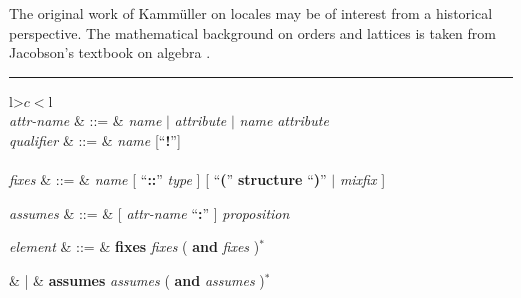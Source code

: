 \begin{isabellebody}
\begin{isamarkuptext}
  The original work of Kamm\"uller on locales \cite{KammullerEtAl1999}
  may be of interest from a historical perspective.  The mathematical
  background on orders and lattices is taken from Jacobson's textbook
  on algebra \cite[Chapter~8]{Jacobson1985}.%
\end{isamarkuptext}%
\isamarkuptrue%
%
\begin{isamarkuptext}%
\begin{table}
\hrule
\vspace{2ex}
\begin{center}
\begin{tabular}{l>$c<$l}
   \\

  \textit{attr-name} & ::=
  & \textit{name} $|$ \textit{attribute} $|$
    \textit{name} \textit{attribute} \\
  \textit{qualifier} & ::=
  & \textit{name} [``\textbf{!}''] \\[2ex]

   \\

  \textit{fixes} & ::=
  & \textit{name} [ ``\textbf{::}'' \textit{type} ]
    [ ``\textbf{(}'' \textbf{structure} ``\textbf{)}'' $|$
    \textit{mixfix} ] \\
\begin{comment}
  \textit{constrains} & ::=
  & \textit{name} ``\textbf{::}'' \textit{type} \\
\end{comment}
  \textit{assumes} & ::=
  & [ \textit{attr-name} ``\textbf{:}'' ] \textit{proposition} \\
\begin{comment}
  \textit{defines} & ::=
  & [ \textit{attr-name} ``\textbf{:}'' ] \textit{proposition} \\
  \textit{notes} & ::=
  & [ \textit{attr-name} ``\textbf{=}'' ]
    ( \textit{qualified-name} [ \textit{attribute} ] )$^+$ \\
\end{comment}

  \textit{element} & ::=
  & \textbf{fixes} \textit{fixes} ( \textbf{and} \textit{fixes} )$^*$ \\
\begin{comment}
  & |
  & \textbf{constrains} \textit{constrains}
    ( \textbf{and} \textit{constrains} )$^*$ \\
\end{comment}
  & |
  & \textbf{assumes} \textit{assumes} ( \textbf{and} \textit{assumes} )$^*$ \\[2ex]


\end{tabular}
\end{center}
\end{table}
\end{isamarkuptext}
\end{isabellebody}
